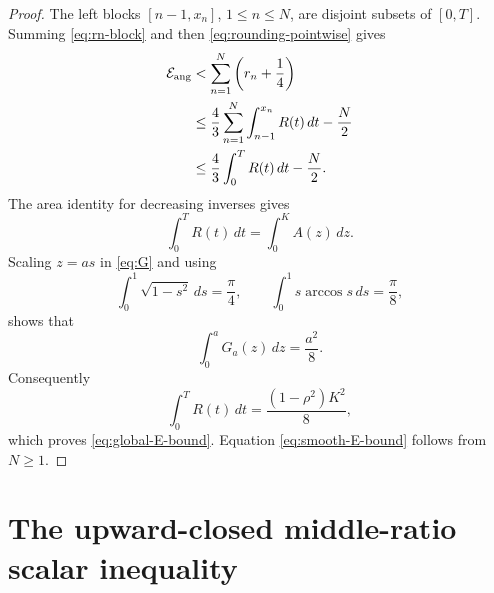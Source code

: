 \documentclass[11pt]{article}
\theoremstyle{remark}
\begin{document}
\begin{proof}
The left blocks $[n-1,x_n]$, $1\leq n\leq N$, are disjoint subsets of
$[0,T]$.  Summing \eqref{eq:rn-block} and then
\eqref{eq:rounding-pointwise} gives
\begin{align*}
 \mathcal E_{\rm ang}
 &<\sum_{n=1}^N\left(r_n+\frac14\right)\\
 &\leq\frac43\sum_{n=1}^N
       \int_{n-1}^{x_n}R(t)\,dt-\frac N2\\
 &\leq\frac43\int_0^T R(t)\,dt-\frac N2.
\end{align*}
The area identity for decreasing inverses gives
\[
 \int_0^T R(t)\,dt=\int_0^K A(z)\,dz.
\]
Scaling $z=as$ in \eqref{eq:G} and using
\[
 \int_0^1\sqrt{1-s^2}\,ds=\frac\pi4,
 \qquad
 \int_0^1s\arccos s\,ds=\frac\pi8,
\]
shows that
\[
 \int_0^aG_a(z)\,dz=\frac{a^2}{8}.
\]
Consequently
\[
 \int_0^T R(t)\,dt=\frac{(1-\rho^2)K^2}{8},
\]
which proves \eqref{eq:global-E-bound}.  Equation
\eqref{eq:smooth-E-bound} follows from $N\geq1$.
\end{proof}

\section{The upward-closed middle-ratio scalar inequality}
\end{document}
